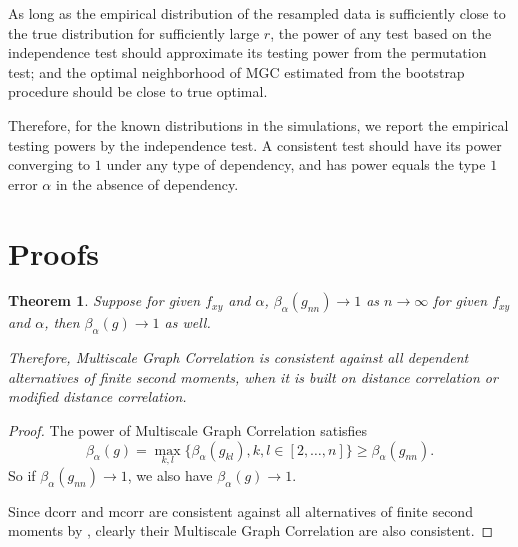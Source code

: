 \documentclass[11pt]{article}
\newtheorem{thm}{Theorem}
\begin{document}
As long as the empirical distribution of the resampled data is sufficiently close to the true distribution for sufficiently large $r$, the power of any test based on the independence test should approximate its testing power from the permutation test; and the optimal neighborhood of MGC estimated from the bootstrap procedure should be close to true optimal.

Therefore, for the known distributions in the simulations, we report the empirical testing powers by the independence test. A consistent test should have its power converging to $1$ under any type of dependency, and has power equals the type $1$ error $\alpha$ in the absence of dependency.  

\section{Proofs}
\label{sec:pfs}


\begin{thm}
Suppose for given $f_{xy}$ and $\alpha$, $\beta_{\alpha}(g_{nn}) \rightarrow 1$ as $n \rightarrow \infty$ for given $f_{xy}$ and $\alpha$, then $\beta_{\alpha}(g) \rightarrow 1$ as well.

Therefore, Multiscale Graph Correlation is consistent against all dependent alternatives of finite second moments, when it is built on distance correlation or modified distance correlation.
\end{thm}
\begin{proof}
The power of Multiscale Graph Correlation satisfies
\begin{equation}
\beta_{\alpha}(g)=\max_{k,l}\{\beta_{\alpha}(g_{kl}), k,l\in [2,\ldots,n]\} \geq \beta_{\alpha}(g_{nn}).
\end{equation}
So if $\beta_{\alpha}(g_{nn}) \rightarrow 1$, we also have $\beta_{\alpha}(g) \rightarrow 1$.

Since dcorr and mcorr are consistent against all alternatives of finite second moments by \cite{SzekelyRizzoBakirov2007, SzekelyRizzo2013a}, clearly their Multiscale Graph Correlation are also consistent.
\end{proof}
\end{document}
